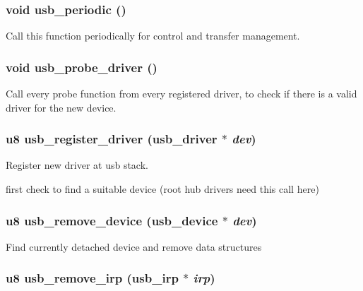 \subsubsection{\setlength{\rightskip}{0pt plus 5cm}void usb\_\-periodic ()}\label{core_8c_56f96c6ef2028c55dce92873a489419d}


Call this function periodically for control and transfer management. 
\subsubsection{\setlength{\rightskip}{0pt plus 5cm}void usb\_\-probe\_\-driver ()}\label{core_8c_99cd77f8e4ac64be0d886f31148acb09}


Call every probe function from every registered driver, to check if there is a valid driver for the new device. 
\subsubsection{\setlength{\rightskip}{0pt plus 5cm}u8 usb\_\-register\_\-driver ({\bf usb\_\-driver} $\ast$ {\em dev})}\label{core_8c_83545d627c3f35ae34e050aab48161ef}


Register new driver at usb stack. 

first check to find a suitable device (root hub drivers need this call here) 
\subsubsection{\setlength{\rightskip}{0pt plus 5cm}u8 usb\_\-remove\_\-device ({\bf usb\_\-device} $\ast$ {\em dev})}\label{core_8c_750a0d6554fd2aec4459d0e3af2dd6ef}


Find currently detached device and remove data structures 
\subsubsection{\setlength{\rightskip}{0pt plus 5cm}u8 usb\_\-remove\_\-irp ({\bf usb\_\-irp} $\ast$ {\em irp})}\label{core_8c_ddc2d9767934c9943b6e08b8b8125b33}



